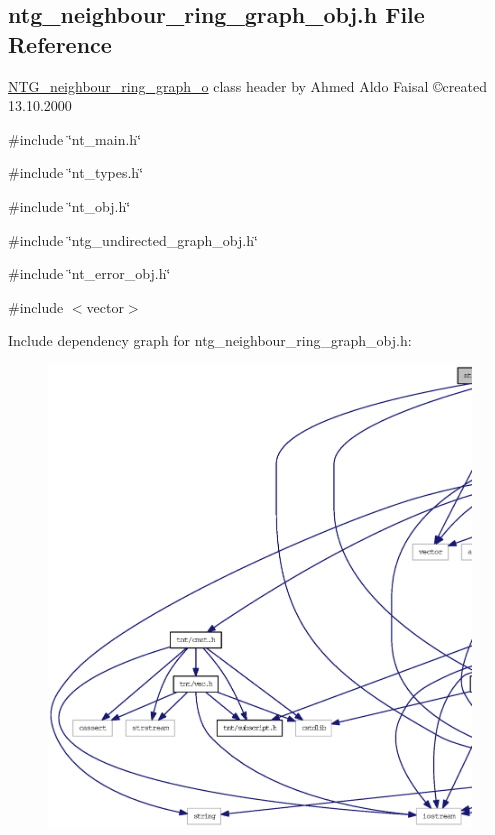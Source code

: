 \subsection{ntg\_\-neighbour\_\-ring\_\-graph\_\-obj.h File Reference}
\label{ntg__neighbour__ring__graph__obj_8h}



\begin{DoxyItemize}
\item \hyperlink{class_n_t_g__neighbour__ring__graph__o}{NTG\_\-neighbour\_\-ring\_\-graph\_\-o} class header by Ahmed Aldo Faisal \copyright created 13.10.2000 
\end{DoxyItemize} 


{\ttfamily \#include \char`\"{}nt\_\-main.h\char`\"{}}\par
{\ttfamily \#include \char`\"{}nt\_\-types.h\char`\"{}}\par
{\ttfamily \#include \char`\"{}nt\_\-obj.h\char`\"{}}\par
{\ttfamily \#include \char`\"{}ntg\_\-undirected\_\-graph\_\-obj.h\char`\"{}}\par
{\ttfamily \#include \char`\"{}nt\_\-error\_\-obj.h\char`\"{}}\par
{\ttfamily \#include $<$vector$>$}\par
Include dependency graph for ntg\_\-neighbour\_\-ring\_\-graph\_\-obj.h:
\nopagebreak
\begin{figure}[H]
\begin{center}
\leavevmode
\includegraphics[width=400pt]{ntg__neighbour__ring__graph__obj_8h__incl}
\end{center}
\end{figure}
